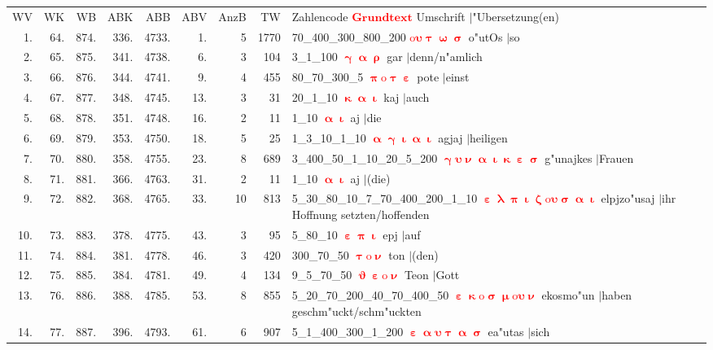 \documentclass[a4paper,10pt,landscape]{article}
\begin{document}
\begin{tabular}{rrrrrrrrp{120mm}}
WV&WK&WB&ABK&ABB&ABV&AnzB&TW&Zahlencode \textcolor{red}{$\boldsymbol{Grundtext}$} Umschrift $|$"Ubersetzung(en)\\
1.&64.&874.&336.&4733.&1.&5&1770&70\_400\_300\_800\_200 \textcolor{red}{$\boldsymbol{\mathrm{o}\upsilon\uptau\upomega\upsigma}$} o"utOs $|$so\\
2.&65.&875.&341.&4738.&6.&3&104&3\_1\_100 \textcolor{red}{$\boldsymbol{\upgamma\upalpha\uprho}$} gar $|$denn/n"amlich\\
3.&66.&876.&344.&4741.&9.&4&455&80\_70\_300\_5 \textcolor{red}{$\boldsymbol{\uppi\mathrm{o}\uptau\upepsilon}$} pote $|$einst\\
4.&67.&877.&348.&4745.&13.&3&31&20\_1\_10 \textcolor{red}{$\boldsymbol{\upkappa\upalpha\upiota}$} kaj $|$auch\\
5.&68.&878.&351.&4748.&16.&2&11&1\_10 \textcolor{red}{$\boldsymbol{\upalpha\upiota}$} aj $|$die\\
6.&69.&879.&353.&4750.&18.&5&25&1\_3\_10\_1\_10 \textcolor{red}{$\boldsymbol{\upalpha\upgamma\upiota\upalpha\upiota}$} agjaj $|$heiligen\\
7.&70.&880.&358.&4755.&23.&8&689&3\_400\_50\_1\_10\_20\_5\_200 \textcolor{red}{$\boldsymbol{\upgamma\upsilon\upnu\upalpha\upiota\upkappa\upepsilon\upsigma}$} g"unajkes $|$Frauen\\
8.&71.&881.&366.&4763.&31.&2&11&1\_10 \textcolor{red}{$\boldsymbol{\upalpha\upiota}$} aj $|$(die)\\
9.&72.&882.&368.&4765.&33.&10&813&5\_30\_80\_10\_7\_70\_400\_200\_1\_10 \textcolor{red}{$\boldsymbol{\upepsilon\uplambda\uppi\upiota\upzeta\mathrm{o}\upsilon\upsigma\upalpha\upiota}$} elpjzo"usaj $|$ihr Hoffnung setzten/hoffenden\\
10.&73.&883.&378.&4775.&43.&3&95&5\_80\_10 \textcolor{red}{$\boldsymbol{\upepsilon\uppi\upiota}$} epj $|$auf\\
11.&74.&884.&381.&4778.&46.&3&420&300\_70\_50 \textcolor{red}{$\boldsymbol{\uptau\mathrm{o}\upnu}$} ton $|$(den)\\
12.&75.&885.&384.&4781.&49.&4&134&9\_5\_70\_50 \textcolor{red}{$\boldsymbol{\upvartheta\upepsilon\mathrm{o}\upnu}$} Teon $|$Gott\\
13.&76.&886.&388.&4785.&53.&8&855&5\_20\_70\_200\_40\_70\_400\_50 \textcolor{red}{$\boldsymbol{\upepsilon\upkappa\mathrm{o}\upsigma\upmu\mathrm{o}\upsilon\upnu}$} ekosmo"un $|$haben geschm"uckt/schm"uckten\\
14.&77.&887.&396.&4793.&61.&6&907&5\_1\_400\_300\_1\_200 \textcolor{red}{$\boldsymbol{\upepsilon\upalpha\upsilon\uptau\upalpha\upsigma}$} ea"utas $|$sich\\

\end{tabular}
\end{document}
